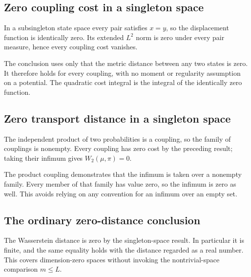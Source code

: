 \documentclass[11pt,a4paper]{report}
\begin{document}
\subsection{\texorpdfstring{Zero coupling cost in a singleton space}{Zero coupling cost in a singleton space}}
\label{report-step-UnadjustedLangevin-Degenerate-lean-1}


In a subsingleton state space every pair satisfies \(x=y\), so the displacement function is identically zero. Its extended \(L^2\) norm is zero under every pair measure, hence every coupling cost vanishes.



The conclusion uses only that the metric distance between any two states is zero. It therefore holds for every coupling, with no moment or regularity assumption on a potential. The quadratic cost integral is the integral of the identically zero function.

\subsection{\texorpdfstring{Zero transport distance in a singleton space}{Zero transport distance in a singleton space}}
\label{report-step-UnadjustedLangevin-Degenerate-lean-2}


The independent product of two probabilities is a coupling, so the family of couplings is nonempty. Every coupling has zero cost by the preceding result; taking their infimum gives \(W_2(\mu,\pi)=0\).



The product coupling demonstrates that the infimum is taken over a nonempty family. Every member of that family has value zero, so the infimum is zero as well. This avoids relying on any convention for an infimum over an empty set.

\subsection{\texorpdfstring{The ordinary zero-distance conclusion}{The ordinary zero-distance conclusion}}
\label{report-step-UnadjustedLangevin-Degenerate-lean-3}


The Wasserstein distance is zero by the singleton-space result. In particular it is finite, and the same equality holds with the distance regarded as a real number. This covers dimension-zero spaces without invoking the nontrivial-space comparison \(m\le L\).
\end{document}
